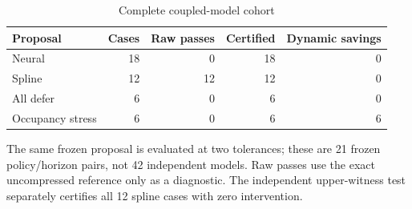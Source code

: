 \begin{table}[htbp]
\centering\footnotesize
\caption{Complete coupled-model cohort}\label{tab:cohort}
\begin{tabular}{lrrrr}\toprule
Proposal & Cases & Raw passes & Certified & Dynamic savings \\\midrule
Neural & 18 & 0 & 18 & 0 \\
Spline & 12 & 12 & 12 & 0 \\
All defer & 6 & 0 & 6 & 0 \\
Occupancy stress & 6 & 0 & 6 & 6 \\
\bottomrule\end{tabular}
\par\smallskip\begin{minipage}{.98\textwidth}\footnotesize The same frozen proposal is evaluated at two tolerances; these are 21 frozen policy/horizon pairs, not 42 independent models. Raw passes use the exact uncompressed reference only as a diagnostic. The independent upper-witness test separately certifies all 12 spline cases with zero intervention.\end{minipage}
\end{table}

